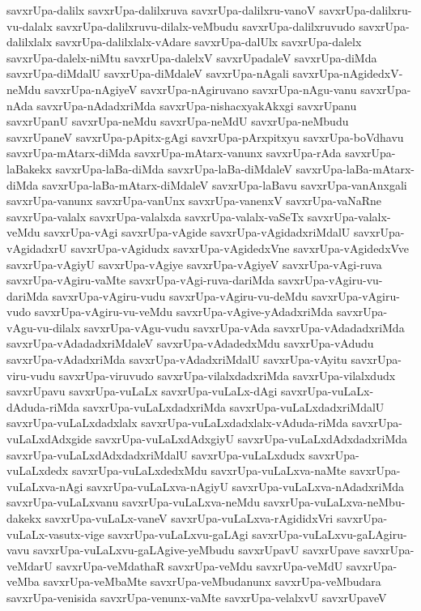 {savxrUpa-dalilx
savxrUpa-dalilxruva
savxrUpa-dalilxru-vanoV
savxrUpa-dalilxru-vu-dalalx
savxrUpa-dalilxruvu-dilalx-veMbudu
savxrUpa-dalilxruvudo
savxrUpa-dalilxlalx
savxrUpa-dalilxlalx-vAdare
savxrUpa-dalUlx
savxrUpa-dalelx
savxrUpa-dalelx-niMtu
savxrUpa-dalelxV
savxrUpadaleV
savxrUpa-diMda
savxrUpa-diMdalU
savxrUpa-diMdaleV
savxrUpa-nAgali
savxrUpa-nAgidedxV-neMdu
savxrUpa-nAgiyeV
savxrUpa-nAgiruvano
savxrUpa-nAgu-vanu
savxrUpa-nAda
savxrUpa-nAdadxriMda
savxrUpa-nishacxyakAkxgi
savxrUpanu
savxrUpanU
savxrUpa-neMdu
savxrUpa-neMdU
savxrUpa-neMbudu
savxrUpaneV
savxrUpa-pApitx-gAgi
savxrUpa-pArxpitxyu
savxrUpa-boVdhavu
savxrUpa-mAtarx-diMda
savxrUpa-mAtarx-vanunx
savxrUpa-rAda
savxrUpa-laBakekx
savxrUpa-laBa-diMda
savxrUpa-laBa-diMdaleV
savxrUpa-laBa-mAtarx-diMda
savxrUpa-laBa-mAtarx-diMdaleV
savxrUpa-laBavu
savxrUpa-vanAnxgali
savxrUpa-vanunx
savxrUpa-vanUnx
savxrUpa-vanenxV
savxrUpa-vaNaRne
savxrUpa-valalx
savxrUpa-valalxda
savxrUpa-valalx-vaSeTx
savxrUpa-valalx-veMdu
savxrUpa-vAgi
savxrUpa-vAgide
savxrUpa-vAgidadxriMdalU
savxrUpa-vAgidadxrU
savxrUpa-vAgidudx
savxrUpa-vAgidedxVne
savxrUpa-vAgidedxVve
savxrUpa-vAgiyU
savxrUpa-vAgiye
savxrUpa-vAgiyeV
savxrUpa-vAgi-ruva
savxrUpa-vAgiru-vaMte
savxrUpa-vAgi-ruva-dariMda
savxrUpa-vAgiru-vu-dariMda
savxrUpa-vAgiru-vudu
savxrUpa-vAgiru-vu-deMdu
savxrUpa-vAgiru-vudo
savxrUpa-vAgiru-vu-veMdu
savxrUpa-vAgive-yAdadxriMda
savxrUpa-vAgu-vu-dilalx
savxrUpa-vAgu-vudu
savxrUpa-vAda
savxrUpa-vAdadadxriMda
savxrUpa-vAdadadxriMdaleV
savxrUpa-vAdadedxMdu
savxrUpa-vAdudu
savxrUpa-vAdadxriMda
savxrUpa-vAdadxriMdalU
savxrUpa-vAyitu
savxrUpa-viru-vudu
savxrUpa-viruvudo
savxrUpa-vilalxdadxriMda
savxrUpa-vilalxdudx
savxrUpavu
savxrUpa-vuLaLx
savxrUpa-vuLaLx-dAgi
savxrUpa-vuLaLx-dAduda-riMda
savxrUpa-vuLaLxdadxriMda
savxrUpa-vuLaLxdadxriMdalU
savxrUpa-vuLaLxdadxlalx
savxrUpa-vuLaLxdadxlalx-vAduda-riMda
savxrUpa-vuLaLxdAdxgide
savxrUpa-vuLaLxdAdxgiyU
savxrUpa-vuLaLxdAdxdadxriMda
savxrUpa-vuLaLxdAdxdadxriMdalU
savxrUpa-vuLaLxdudx
savxrUpa-vuLaLxdedx
savxrUpa-vuLaLxdedxMdu
savxrUpa-vuLaLxva-naMte
savxrUpa-vuLaLxva-nAgi
savxrUpa-vuLaLxva-nAgiyU
savxrUpa-vuLaLxva-nAdadxriMda
savxrUpa-vuLaLxvanu
savxrUpa-vuLaLxva-neMdu
savxrUpa-vuLaLxva-neMbu-dakekx
savxrUpa-vuLaLx-vaneV
savxrUpa-vuLaLxva-rAgididxVri
savxrUpa-vuLaLx-vasutx-vige
savxrUpa-vuLaLxvu-gaLAgi
savxrUpa-vuLaLxvu-gaLAgiru-vavu
savxrUpa-vuLaLxvu-gaLAgive-yeMbudu
savxrUpavU
savxrUpave
savxrUpa-veMdarU
savxrUpa-veMdathaR
savxrUpa-veMdu
savxrUpa-veMdU
savxrUpa-veMba
savxrUpa-veMbaMte
savxrUpa-veMbudanunx
savxrUpa-veMbudara
savxrUpa-venisida
savxrUpa-venunx-vaMte
savxrUpa-velalxvU
savxrUpaveV
}

